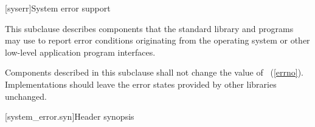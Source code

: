 [syserr]{System error support}

\pnum
This subclause describes components that the standard library and
\Cpp programs may use to report error conditions originating from
the operating system or other low-level application program interfaces.

\pnum
Components described in this subclause shall not change the value of
~(\ref{errno}).
Implementations should leave the error states provided by other
libraries unchanged.

[system_error.syn]{Header  synopsis}
%
%
%
%
%
%
%
%
%

